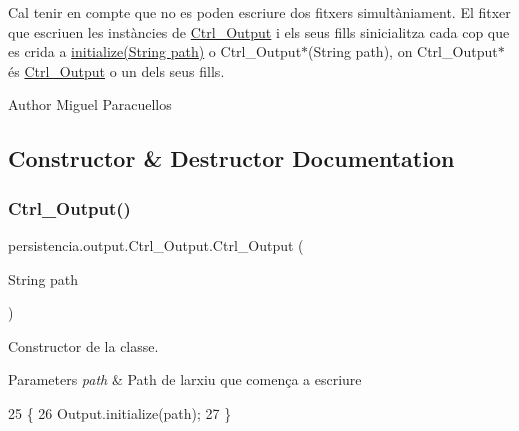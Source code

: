 Cal tenir en compte que no es poden escriure dos fitxers simultàniament. El fitxer que escriuen les instàncies de \hyperlink{classpersistencia_1_1output_1_1Ctrl__Output}{Ctrl\+\_\+\+Output} i els seus fills s\textquotesingle{}inicialitza cada cop que es crida a \hyperlink{classpersistencia_1_1output_1_1Ctrl__Output_a83bd01197acdeb0a697f21ca9854c457}{initialize(\+String path)} o Ctrl\+\_\+\+Output$\ast$(String path), on Ctrl\+\_\+\+Output$\ast$ és \hyperlink{classpersistencia_1_1output_1_1Ctrl__Output}{Ctrl\+\_\+\+Output} o un dels seus fills.

\begin{DoxyAuthor}{Author}
Miguel Paracuellos 
\end{DoxyAuthor}


\subsection{Constructor \& Destructor Documentation}
\mbox{\label{classpersistencia_1_1output_1_1Ctrl__Output_ab8a70c7d09789826249d8556ce3531f6}} 
\subsubsection{\texorpdfstring{Ctrl\+\_\+\+Output()}{Ctrl\_Output()}\hspace{0.1cm}{\footnotesize\ttfamily [1/2]}}
{\footnotesize\ttfamily persistencia.\+output.\+Ctrl\+\_\+\+Output.\+Ctrl\+\_\+\+Output (\begin{DoxyParamCaption}\item[{String}]{path }\end{DoxyParamCaption})\hspace{0.3cm}{\ttfamily [inline]}}



Constructor de la classe. 


\begin{DoxyParams}{Parameters}
{\em path} & Path de l\textquotesingle{}arxiu que comença a escriure \\
\hline
\end{DoxyParams}

\begin{DoxyCode}
25                                     \{
26         Output.initialize(path);
27     \}
\end{DoxyCode}
\mbox{\label{classpersistencia_1_1output_1_1Ctrl__Output_a8f5bf9038ef97c01d13acd211985cd7a}} 
